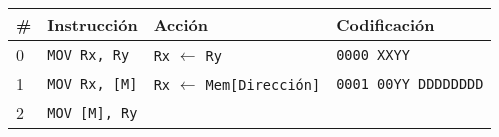 \documentclass[12pt,twoside]{templates/unerthesis}
\begin{document}
\begin{longtable}[]{@{}llll@{}}
\toprule
\begin{minipage}[b]{0.09\columnwidth}\raggedright
\#\strut
\end{minipage} & \begin{minipage}[b]{0.27\columnwidth}\raggedright
Instrucción\strut
\end{minipage} & \begin{minipage}[b]{0.27\columnwidth}\raggedright
Acción\strut
\end{minipage} & \begin{minipage}[b]{0.27\columnwidth}\raggedright
Codificación\strut
\end{minipage}\tabularnewline
\midrule
\endhead
\begin{minipage}[t]{0.09\columnwidth}\raggedright
0\strut
\end{minipage} & \begin{minipage}[t]{0.27\columnwidth}\raggedright
\texttt{MOV\ Rx,\ Ry}\strut
\end{minipage} & \begin{minipage}[t]{0.27\columnwidth}\raggedright
\texttt{Rx} \(\leftarrow\) \texttt{Ry}\strut
\end{minipage} & \begin{minipage}[t]{0.27\columnwidth}\raggedright
\texttt{0000\ XXYY}\strut
\end{minipage}\tabularnewline
\begin{minipage}[t]{0.09\columnwidth}\raggedright
1\strut
\end{minipage} & \begin{minipage}[t]{0.27\columnwidth}\raggedright
\texttt{MOV\ Rx,\ {[}M{]}}\strut
\end{minipage} & \begin{minipage}[t]{0.27\columnwidth}\raggedright
\texttt{Rx} \(\leftarrow\) \texttt{Mem{[}Dirección{]}}\strut
\end{minipage} & \begin{minipage}[t]{0.27\columnwidth}\raggedright
\texttt{0001\ 00YY\ DDDDDDDD}\strut
\end{minipage}\tabularnewline
\begin{minipage}[t]{0.09\columnwidth}\raggedright
2\strut
\end{minipage} & \begin{minipage}[t]{0.27\columnwidth}\raggedright
\texttt{MOV\ {[}M{]},\ Ry}\strut
\end{minipage} & \begin{minipage}[t]{0.27\columnwidth}\raggedright

\end{minipage}
\end{longtable}
\end{document}
